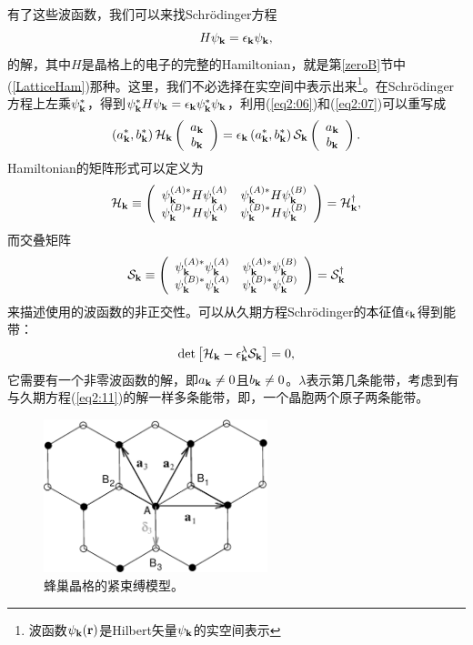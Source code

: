 \documentclass[10pt]{book}
\newcommand{\bk}{{\bf k}}
\newcommand{\br}{{\bf r}}
\newcommand{\Smath}{\mathcal{S}}
\newcommand{\Hmath}{\mathcal{H}}
\newcommand{\beq}{\begin{equation}}
\newcommand{\eeq}{\end{equation}}
\begin{document}
有了这些波函数，我们可以来找Schr\"odinger方程
\[H\psi_{\bk}=\epsilon_{\bk}\psi_{\bk},\]
的解，其中$H$是晶格上的电子的完整的Hamiltonian，就是第\ref{zeroB}节中(\ref{LatticeHam})那种。这里，我们不必选择在实空间中表示出来\footnote{波函数$\psi_{\bk}(\br)$是Hilbert矢量$\psi_{\bk}$的实空间表示}。在Schr\"odinger方程上左乘$\psi_{\bk}^*$，得到$\psi_{\bk}^*H\psi_{\bk}=\epsilon_{\bk}\psi_{\bk}^*\psi_{\bk}$，利用(\ref{eq2:06})和(\ref{eq2:07})可以重写成
\beq\label{eq2:08}
\left(a_{\bk}^*,b_{\bk}^*\right)\Hmath_{\bk}
\left(\begin{array}{c} a_{\bk} \\ b_{\bk}\end{array}\right)=
\epsilon_{\bk}\left(a_{\bk}^*,b_{\bk}^*\right)\Smath_{\bk}
\left(\begin{array}{c} a_{\bk} \\ b_{\bk}\end{array}\right).
\eeq
Hamiltonian的矩阵形式可以定义为
\beq\label{eq2:09}
\Hmath_{\bk}\equiv \left(
\begin{array}{cc}
 \psi_{\bk}^{(A)*}H\psi_{\bk}^{(A)} & \psi_{\bk}^{(A)*}H\psi_{\bk}^{(B)} \\
\psi_{\bk}^{(B)*}H\psi_{\bk}^{(A)} & \psi_{\bk}^{(B)*}H\psi_{\bk}^{(B)} 
\end{array}\right)
=\Hmath_{\bk}^{\dagger},
\eeq
而交叠矩阵
\beq\label{eq2:10}
\Smath_{\bk}\equiv \left(
\begin{array}{cc}
 \psi_{\bk}^{(A)*}\psi_{\bk}^{(A)} & \psi_{\bk}^{(A)*}\psi_{\bk}^{(B)} \\
\psi_{\bk}^{(B)*}\psi_{\bk}^{(A)} & \psi_{\bk}^{(B)*}\psi_{\bk}^{(B)} 
\end{array}\right)
=\Smath_{\bk}^{\dagger}
\eeq
来描述使用的波函数的非正交性。可以从久期方程Schr\"odinger的本征值$\epsilon_{\bk}$得到能带：
\beq\label{eq2:11}
\det\left[\Hmath_{\bk}-\epsilon_{\bk}^{\lambda}\Smath_{\bk}\right]=0,
\eeq
它需要有一个非零波函数的解，即$a_{\bk}\neq 0$且$b_{\bk}\neq 0$。$\lambda$表示第几条能带，考虑到有与久期方程(\ref{eq2:11})的解一样多条能带，即，一个晶胞两个原子两条能带。


\begin{figure}
\centering
\includegraphics[width=6.5cm,angle=0]{honeycomblattice2.eps}
\caption{蜂巢晶格的紧束缚模型。}
\label{fig2:01}
\end{figure}
\end{document}

